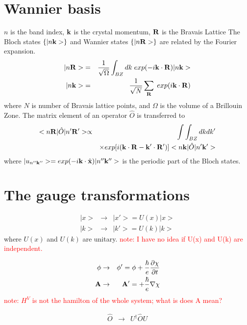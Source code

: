 \documentclass[aps,prb,preprint]{revtex4-1}
\begin{document}
\begin{appendix}
\section{Wannier basis}
$n$ is the band index, $\bf k$ is the crystal momentum, ${\bf R} $ is the Bravais Lattice
The Bloch states $\{ |n{\bf k}> \}$ and Wannier states $\{ |n{\bf R}> \}$ are related by the Fourier expansion. 
\begin{eqnarray}
|n{\bf R}>&=&\frac{1}{\sqrt{\Omega}} \int_{BZ} dk \; exp(-i{\bf k} \cdot {\bf R})|n{\bf k}>\\
|n{\bf k}>&=&\frac{1}{\sqrt{N}} \sum_{\bf R} \; exp(i{\bf k} \cdot {\bf R}) 
\end{eqnarray} 
where $N$ is number of Bravais lattice points, and $\Omega$ is the volume of a Brillouin Zone. 
The matrix element of an operator $\hat{O}$ is transferred to 
\begin{eqnarray}
 < n{\bf R}| \hat{O} |n'{\bf R'}> \propto && \int \int_{BZ} dk dk'  \\
&& \times  exp[i ({\bf k} \cdot {\bf R}- {\bf k'} \cdot {\bf R'} ) ]< n{\bf k}| \hat{O} |n'{\bf k'}>  \nonumber 
\end{eqnarray} 
where $|u_{n''{\bf k''}}> = exp(-i{\bf k} \cdot \hat{\bf x}) |n''{\bf k''}>$ is the periodic part of the Bloch states.

\section{The gauge transformations}
\begin{eqnarray}
|x> &\rightarrow& |x'> = U(x) |x> \\
|k> &\rightarrow& |k'> = U(k) |k>
\end{eqnarray} 
where $U(x)$ and $U(k)$ are unitary.
\textcolor{red}{note: I have no idea if U(x) and U(k) are independent. }

\begin{eqnarray}
\phi &\rightarrow& \phi' = \phi +\frac{\hbar}{e} \frac{\partial \chi}{\partial t} \\
{\bf A} &\rightarrow& {\bf A}' = +\frac{\hbar}{e} {\bf \nabla} \chi
\end{eqnarray} 
\textcolor{red}{note: $H^V$ is not the hamilton of the whole system; what is does A mean?}

\begin{eqnarray}
\hat{O} &\rightarrow& U^{\dag} \hat{O} U \nonumber 
\end{eqnarray} 


\end{appendix}
\end{document}
